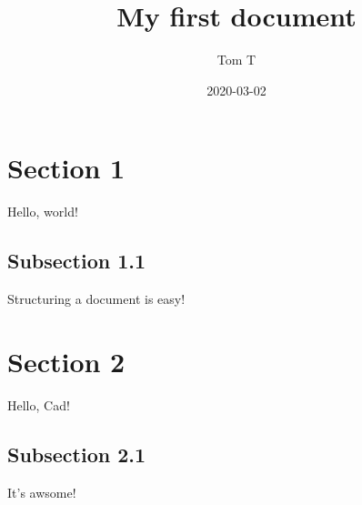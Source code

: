 \documentclass{article}
\title{My first document}
\date{2020-03-02}
\author{Tom T}
\begin{document}
    \maketitle
    \newpage
    
    \section{Section 1}
    Hello, world!

    \subsection{Subsection 1.1}
    Structuring a document is easy!

    \section{Section 2}
    Hello, Cad!

    \subsection{Subsection 2.1}
    It's awsome!
\end{document}
